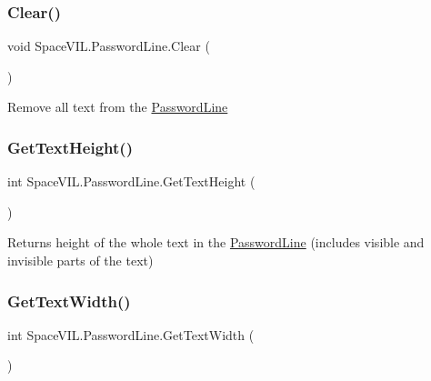 \subsubsection{\texorpdfstring{Clear()}{Clear()}}
{\footnotesize\ttfamily void Space\+V\+I\+L.\+Password\+Line.\+Clear (\begin{DoxyParamCaption}{ }\end{DoxyParamCaption})}



Remove all text from the \mbox{\hyperlink{class_space_v_i_l_1_1_password_line}{Password\+Line}} 

\mbox{\label{class_space_v_i_l_1_1_password_line_a6b936fd21b93ef5e5cccc503c8a63c3f}} 
\subsubsection{\texorpdfstring{Get\+Text\+Height()}{GetTextHeight()}}
{\footnotesize\ttfamily int Space\+V\+I\+L.\+Password\+Line.\+Get\+Text\+Height (\begin{DoxyParamCaption}{ }\end{DoxyParamCaption})}



Returns height of the whole text in the \mbox{\hyperlink{class_space_v_i_l_1_1_password_line}{Password\+Line}} (includes visible and invisible parts of the text) 

\mbox{\label{class_space_v_i_l_1_1_password_line_ac2a6cfda053e0134ab1c139abb7709a3}} 
\subsubsection{\texorpdfstring{Get\+Text\+Width()}{GetTextWidth()}}
{\footnotesize\ttfamily int Space\+V\+I\+L.\+Password\+Line.\+Get\+Text\+Width (\begin{DoxyParamCaption}{ }\end{DoxyParamCaption})}



